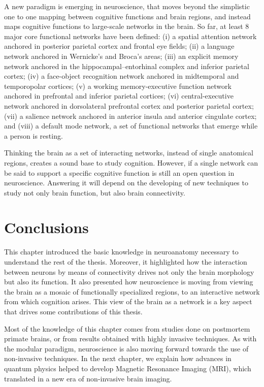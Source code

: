A new paradigm is emerging in neuroscience, that moves beyond the simplistic
one to one mapping between cognitive functions and brain regions, and instead
maps cognitive functions to large-scale networks in the brain. So far, at least
8 major core functional networks have been defined\cite{Bressler2010}:
(i) a spatial attention network anchored in posterior parietal cortex and frontal eye fields;
(ii) a language network anchored in Wernicke’s and Broca’s areas;
(iii) an explicit memory network anchored in the hippocampal–entorhinal 
complex and inferior parietal cortex; (iv) a face-object recognition
network anchored in midtemporal and temporopolar cortices; (v) a
working memory-executive function network anchored in prefrontal and
inferior parietal cortices; (vi) central-executive network anchored in
dorsolateral prefrontal cortex and posterior parietal cortex; (vii) a salience
network anchored in anterior insula and anterior cingulate cortex; and (viii)
a default mode network, a set of functional networks that emerge while a person
is resting.

Thinking the brain as a set of interacting networks, instead of single anatomical
regions, creates a sound base to study cognition\cite{Bressler2010}. However,
if a single network can be said to support a specific cognitive function is 
still an open question in neuroscience. Answering it will depend on the 
developing of new techniques to study not only brain function, but also brain
connectivity.

\section{Conclusions}
This chapter introduced the basic knowledge in neuroanatomy necessary to
understand the rest of the thesis. Moreover, it highlighted  how the interaction
between neurons by means of connectivity drives not only the brain morphology
but also its function. It also presented how neuroscience is moving from
viewing the brain as a mosaic of functionally specialized regions, to an
interactive network from which cognition arises. This view of the brain as 
a network is a key aspect that drives some contributions of this thesis.

Most of the knowledge of this chapter comes from studies done on 
postmortem primate brains, or from results obtained with highly invasive
techniques. As with the modular paradigm, neuroscience is also moving forward
towards the use of non-invasive techniques. In the next chapter, we explain how 
advances in quantum physics helped to develop Magnetic Resonance Imaging (MRI),
which translated in a new era of non-invasive brain imaging.

\chapterbib
